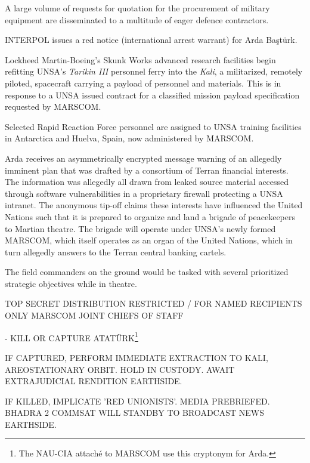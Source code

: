 A large volume of requests for quotation for the procurement of military equipment are disseminated to a multitude of eager defence contractors.
\StopTimelineDate

INTERPOL issues a red notice (international arrest warrant) for Arda Baştürk.
\StopTimelineDate

Lockheed Martin-Boeing's Skunk Works advanced research facilities begin refitting UNSA's {\it Tarikin III} personnel ferry into the {\it Kali}, a militarized, remotely piloted, spacecraft carrying a payload of personnel and materials. This is in response to a UNSA issued contract for a classified mission payload specification requested by MARSCOM.
\StopTimelineDate

Selected Rapid Reaction Force personnel are assigned to UNSA training facilities in Antarctica and Huelva, Spain, now administered by MARSCOM.
\StopTimelineDate

Arda receives an asymmetrically encrypted message warning of an allegedly imminent plan that was drafted by a consortium of Terran financial interests. The information was allegedly all drawn from leaked source material accessed through software vulnerabilities in a proprietary firewall protecting a UNSA intranet. The anonymous tip-off claims these interests have influenced the United Nations such that it is prepared to organize and land a brigade of peacekeepers to Martian theatre. The brigade will operate under UNSA's newly formed MARSCOM, which itself operates as an organ of the United Nations, which in turn allegedly answers to the Terran central banking cartels. 

The field commanders on the ground would be tasked with several prioritized strategic objectives while in theatre. 

\startTimelineCorrespondenceDocument
TOP SECRET
DISTRIBUTION RESTRICTED / FOR NAMED RECIPIENTS ONLY
MARSCOM JOINT CHIEFS OF STAFF
\startitemize[4]
\item {} - KILL OR CAPTURE ATATÜRK\footnote{The NAU-CIA attaché to MARSCOM use this cryptonym for Arda.}

    \startitemize[n]
    \item IF CAPTURED, PERFORM IMMEDIATE EXTRACTION TO KALI, AREOSTATIONARY ORBIT. HOLD IN CUSTODY. AWAIT EXTRAJUDICIAL RENDITION EARTHSIDE.
    \item IF KILLED, IMPLICATE 'RED UNIONISTS'. MEDIA PREBRIEFED. BHADRA 2 COMMSAT WILL STANDBY TO BROADCAST NEWS EARTHSIDE.
    \stopitemize

